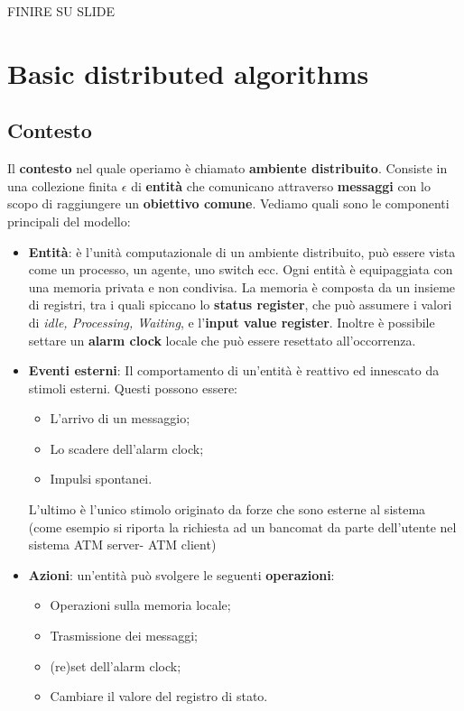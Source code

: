 \documentclass[12pt]{article}
\begin{document}
		FINIRE SU SLIDE 
		
\section{Basic distributed algorithms}
	\subsection{Contesto}
		Il \textbf{contesto} nel quale operiamo è chiamato \textbf{ambiente distribuito}. Consiste in una collezione finita $\epsilon$ di \textbf{entità} che comunicano attraverso \textbf{messaggi} con lo scopo di raggiungere un \textbf{obiettivo comune}. Vediamo quali sono le componenti principali del modello:
		\begin{itemize}
			\item \textbf{Entità}: è l'unità computazionale di un ambiente distribuito, può essere vista come un processo, un agente, uno switch ecc. Ogni entità è equipaggiata con una memoria privata e non condivisa. La memoria è composta da un insieme di registri, tra i quali spiccano lo \textbf{status register}, che può assumere i valori di \textit{idle, Processing, Waiting}, e l'\textbf{input value register}. Inoltre è possibile settare un \textbf{alarm clock} locale che può essere resettato all'occorrenza.
			\item \textbf{Eventi esterni}: Il comportamento di un'entità è reattivo ed innescato da stimoli esterni. Questi possono essere:
			\begin{itemize}
				\item L'arrivo di un messaggio;
				\item Lo scadere dell'alarm clock;
				\item Impulsi spontanei.
			\end{itemize}
			L'ultimo è l'unico stimolo originato da forze che sono esterne al sistema (come esempio si riporta la richiesta ad un bancomat da parte dell'utente nel sistema ATM server- ATM client)
			\item \textbf{Azioni}: un'entità può svolgere le seguenti \textbf{operazioni}:
		\begin{itemize}
			\item Operazioni sulla memoria locale;
			\item Trasmissione dei messaggi;
			\item (re)set dell'alarm clock;
			\item Cambiare il valore del registro di stato.
		\end{itemize}

\end{itemize}
\end{document}
